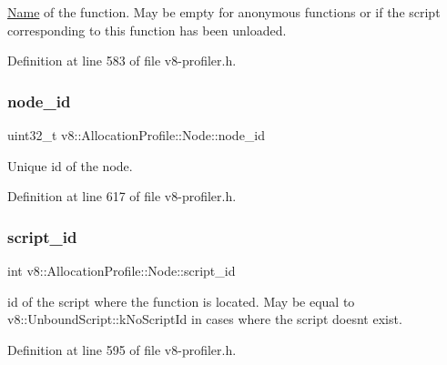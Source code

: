 \mbox{\hyperlink{classv8_1_1Name}{Name}} of the function. May be empty for anonymous functions or if the script corresponding to this function has been unloaded. 

Definition at line 583 of file v8-\/profiler.\+h.

\mbox{\label{structv8_1_1AllocationProfile_1_1Node_aa2a43ec43107692b2cfcb3b2b00aa801}} 
\subsubsection{\texorpdfstring{node\+\_\+id}{node\_id}}
{\footnotesize\ttfamily uint32\+\_\+t v8\+::\+Allocation\+Profile\+::\+Node\+::node\+\_\+id}

Unique id of the node. 

Definition at line 617 of file v8-\/profiler.\+h.

\mbox{\label{structv8_1_1AllocationProfile_1_1Node_a4a746de878d9ad42b32fda4c365b98fb}} 
\subsubsection{\texorpdfstring{script\+\_\+id}{script\_id}}
{\footnotesize\ttfamily int v8\+::\+Allocation\+Profile\+::\+Node\+::script\+\_\+id}

id of the script where the function is located. May be equal to v8\+::\+Unbound\+Script\+::k\+No\+Script\+Id in cases where the script doesn\textquotesingle{}t exist. 

Definition at line 595 of file v8-\/profiler.\+h.

\mbox{\label{structv8_1_1AllocationProfile_1_1Node_acd6567ac06a0bae713390559128e9c62}} 
